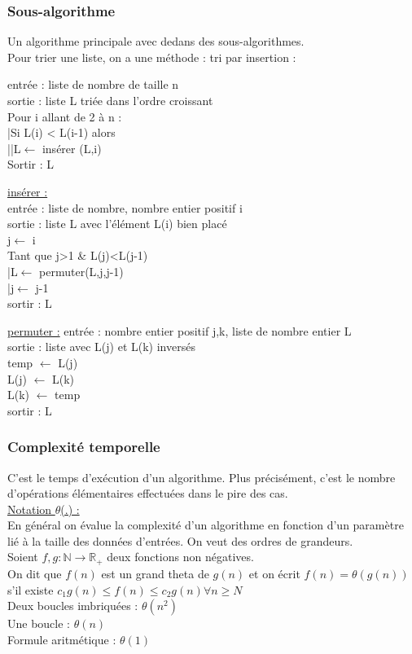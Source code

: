 \documentclass[../main.tex]{subfiles}
\begin{document}
\subsubsection{Sous-algorithme}
Un algorithme principale avec dedans des sous-algorithmes.\\
Pour trier une liste, on a une méthode : tri par insertion :\\
\begin{minipage}{.5\textwidth}
    entrée : liste de nombre de taille n\\
sortie : liste L triée dans l'ordre croissant\\
Pour i allant de 2 à n :\\
|Si L(i) < L(i-1) alors \\
||L$\leftarrow$ insérer (L,i)\\
Sortir : L
\end{minipage}
\hfill
\begin{minipage}{.5\textwidth}
    \underline{insérer :}\\
    entrée : liste de nombre, nombre entier positif i\\
    sortie : liste L avec l'élément L(i) bien placé\\
    j$\leftarrow$ i \\
    Tant que j>1 \& L(j)<L(j-1)\\
    |L$\leftarrow$ permuter(L,j,j-1)\\
    |j$\leftarrow$ j-1\\
    sortir : L
\end{minipage}
\underline{permuter :} entrée : nombre entier positif j,k, liste de nombre entier L\\
sortie : liste avec L(j) et L(k) inversés\\
temp $\leftarrow$ L(j)\\
L(j) $\leftarrow$ L(k)\\
L(k) $\leftarrow$ temp\\
sortir : L\\

\subsubsection{Complexité temporelle}
C'est le temps d'exécution d'un algorithme. Plus précisément, c'est le nombre d'opérations élémentaires effectuées dans le pire des cas.\\

\quad \underline{Notation $\theta$(.) :}\\
En général on évalue la complexité d'un algorithme en fonction d'un paramètre lié à la taille des données d'entrées. On veut des ordres de grandeurs.\\
Soient $f,g : \mathbb{N} \rightarrow \mathbb{R}_+$ deux fonctions non négatives.\\
On dit que $f(n)$ est un grand theta de $g(n)$ et on écrit $f(n) = \theta(g(n))$ s'il existe $c_1 g(n) \leq f(n) \leq c_2g(n) \forall n \geq N$\\
Deux boucles imbriquées : $\theta(n^2)$\\
Une boucle : $\theta(n)$\\
Formule aritmétique : $\theta(1)$\\
\end{document}
